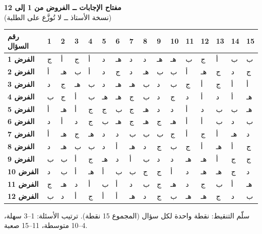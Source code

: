 \documentclass[11pt,a4paper]{article}
\begin{document}
\begin{center}
{\Large\khatt\textbf{مفتاح الإجابات ــ الفروض من 1 إلى 12}}\\[4pt]
{\small (نسخة الأستاذ ــ لا تُوزَّع على الطلبة)}\\[10pt]
\renewcommand{\arraystretch}{1.8}
\begin{tabular}{|>{\centering\arraybackslash}m{2.2cm}|*{15}{>{\centering\arraybackslash}m{0.62cm}|}}
\hline
\textbf{رقم السؤال} & \textbf{1} & \textbf{2} & \textbf{3} & \textbf{4} & \textbf{5} & \textbf{6} & \textbf{7} & \textbf{8} & \textbf{9} & \textbf{10} & \textbf{11} & \textbf{12} & \textbf{13} & \textbf{14} & \textbf{15} \\ \hline\hline
\rowcolor{red!14}\textbf{الفرض 1} & ج & أ & ج & أ & د & هـ & د & د & هـ & هـ & ب & ج & أ & ب & ب \\ \hline
\rowcolor{orange!18}\textbf{الفرض 2} & أ & هـ & ب & أ & د & ج & د & هـ & ب & ب & أ & هـ & ج & د & ج \\ \hline
\rowcolor{yellow!25}\textbf{الفرض 3} & د & ج & هـ & ب & د & هـ & هـ & ب & د & ب & ج & أ & ج & أ & أ \\ \hline
\rowcolor{lime!22}\textbf{الفرض 4} & ب & ج & أ & ب & هـ & هـ & ج & ب & د & ج & د & أ & د & أ & هـ \\ \hline
\rowcolor{green!16}\textbf{الفرض 5} & أ & هـ & أ & ج & ج & ب & ج & هـ & د & د & أ & د & ب & ب & هـ \\ \hline
\rowcolor{teal!16}\textbf{الفرض 6} & د & أ & د & ج & ب & هـ & ج & هـ & ج & هـ & أ & أ & ب & د & ب \\ \hline
\rowcolor{cyan!16}\textbf{الفرض 7} & أ & هـ & ج & هـ & د & د & ب & ب & ب & ج & أ & ج & أ & هـ & د \\ \hline
\rowcolor{blue!12}\textbf{الفرض 8} & د & هـ & ب & ب & د & أ & هـ & د & ج & ب & ج & أ & هـ & أ & ج \\ \hline
\rowcolor{violet!14}\textbf{الفرض 9} & ب & ب & أ & ج & هـ & د & أ & ب & د & د & هـ & هـ & أ & ج & ج \\ \hline
\rowcolor{purple!14}\textbf{الفرض 10} & د & ب & أ & هـ & أ & ب & ب & ج & ج & أ & د & هـ & هـ & ج & د \\ \hline
\rowcolor{magenta!14}\textbf{الفرض 11} & ج & هـ & د & أ & ب & أ & د & ب & ج & هـ & د & ج & ب & أ & هـ \\ \hline
\rowcolor{brown!18}\textbf{الفرض 12} & ب & د & أ & ج & أ & أ & هـ & د & ج & ب & هـ & هـ & ج & د & ب \\ \hline
\end{tabular}

\vspace{10pt}
{\small سلّم التنقيط: نقطة واحدة لكل سؤال (المجموع 15 نقطة). ترتيب الأسئلة: 1--3 سهلة، 4--10 متوسطة، 11--15 صعبة.}
\end{center}
\end{document}
